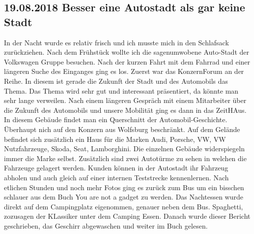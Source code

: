 \subsection{19.08.2018 Besser eine Autostadt als gar keine Stadt}
In der Nacht wurde es relativ frisch und ich musste mich in den Schlafsack zurückziehen.
Nach dem Frühstück wollte ich die sagenumwobene Auto-Stadt der Volkswagen Gruppe besuchen.
Nach der kurzen Fahrt mit dem Fahrrad und einer längeren Suche des Einganges ging es los.
Zuerst war das KonzernForum an der Reihe. 
In diesem ist gerade die Zukunft der Stadt und des Automobils das Thema.
Das Thema wird sehr gut und interessant präsentiert, da könnte man sehr lange verweilen.
Nach einem längeren Gespräch mit einem Mitarbeiter über die Zukunft des Automobils und unsere Mobilität ging es dann in das ZeitHAus.
In diesem Gebäude findet man ein Querschnitt der Automobil-Geschichte.
Überhaupt nich auf den Konzern aus Wolfsburg beschränkt.
Auf dem Gelände befindet sich zusätzlich ein Haus für die Marken Audi, Porsche, VW, VW Nutzfahrzeuge, Skoda, Seat, Lamborghini.
Die einzelnen Gebäude widerspiegeln immer die Marke selbst. 
Zusätzlich sind zwei Autotürme zu sehen in welchen die Fahrzeuge gelagert werden.
Kunden können in der Autostadt ihr Fahrzeug abholen und auch gleich auf einer internen Teststrecke kennenlernen.
Nach etlichen Stunden und noch mehr Fotos ging es zurück zum Bus um ein bisschen schlauer aus dem Buch \glqq You are not a gadget\grqq{} zu werden.
Das Nachtessen wurde direkt auf dem Campingplatz eigenommen, genauer neben dem Bus.
Spaghetti, zozusagen der KLassiker unter dem Camping Essen.
Danach wurde dieser Bericht geschrieben, das Geschirr abgewaschen und weiter im Buch gelesen.

